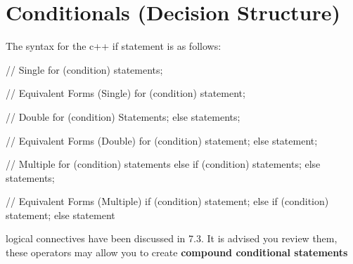 \documentclass{report}
\begin{document}
    \pagebreak \bigbreak \noindent 
    \section{\LARGE Conditionals (Decision Structure)}
    \bigbreak \noindent 
    The syntax for the c++ if statement is as follows:
    \smallbreak \noindent
    
    \begin{cppcode}

    // Single
    for (condition){
        statements;
    }

    // Equivalent Forms (Single)
    for (condition)
        statement;

    // Double
    for (condition){
        Statements;
    }else {
        statements;
    }

    // Equivalent Forms (Double)
    for (condition)
        statement;
    else 
        statement;

    // Multiple
    for (condition){
        statements
    }else if (condition){
        statements;
    }else {
       statements; 
    }

    // Equivalent Forms (Multiple)
    if (condition)
        statement;
    else if (condition)
        statement;
    else 
        statement

    \end{cppcode}
    

    \bigbreak \noindent 
    \begin{notebox}
        logical connectives have been discussed in 7.3. It is advised you review them, these operators may allow you to create \textbf{compound conditional statements}
    \end{notebox}

    \pagebreak \bigbreak \noindent 
\end{document}
